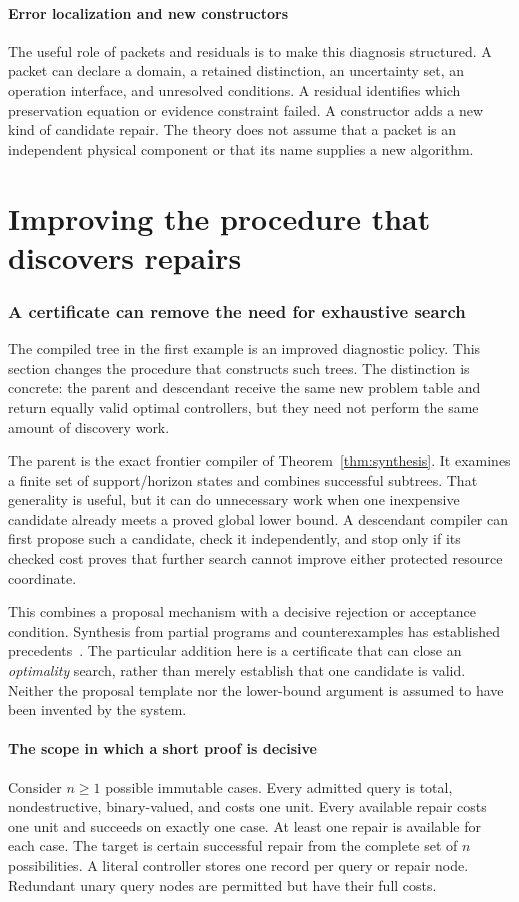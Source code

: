 \documentclass[11pt,letterpaper]{article}
\theoremstyle{plain}
\theoremstyle{definition}
\begin{document}
\subsection{Error localization and new constructors}
The useful role of packets and residuals is to make this diagnosis structured. A packet can declare a domain, a retained distinction, an uncertainty set, an operation interface, and unresolved conditions. A residual identifies which preservation equation or evidence constraint failed. A constructor adds a new kind of candidate repair. The theory does not assume that a packet is an independent physical component or that its name supplies a new algorithm.

\clearpage\part{Improving the procedure that discovers repairs}\label{part:discovery}
\section{A certificate can remove the need for exhaustive search}\label{sec:compiler-change}
The compiled tree in the first example is an improved diagnostic policy. This section changes the procedure that constructs such trees. The distinction is concrete: the parent and descendant receive the same new problem table and return equally valid optimal controllers, but they need not perform the same amount of discovery work.

The parent is the exact frontier compiler of Theorem~\ref{thm:synthesis}. It examines a finite set of support/horizon states and combines successful subtrees. That generality is useful, but it can do unnecessary work when one inexpensive candidate already meets a proved global lower bound. A descendant compiler can first propose such a candidate, check it independently, and stop only if its checked cost proves that further search cannot improve either protected resource coordinate.

This combines a proposal mechanism with a decisive rejection or acceptance condition. Synthesis from partial programs and counterexamples has established precedents~\cite{sketch}. The particular addition here is a certificate that can close an \emph{optimality} search, rather than merely establish that one candidate is valid. Neither the proposal template nor the lower-bound argument is assumed to have been invented by the system.

\subsection{The scope in which a short proof is decisive}
Consider $n\geq1$ possible immutable cases. Every admitted query is total, nondestructive, binary-valued, and costs one unit. Every available repair costs one unit and succeeds on exactly one case. At least one repair is available for each case. The target is certain successful repair from the complete set of $n$ possibilities. A literal controller stores one record per query or repair node. Redundant unary query nodes are permitted but have their full costs.
\end{document}
